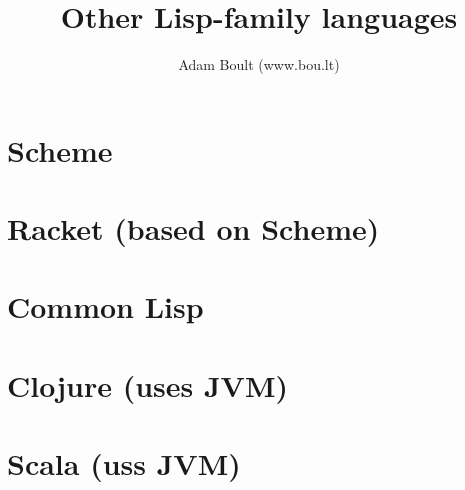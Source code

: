 \documentclass[oneside]{book}
\begin{document}
\author{Adam Boult (www.bou.lt)}
\title{Other Lisp-family languages}
\maketitle

\setcounter{tocdepth}{0}
\tableofcontents



\part{Scheme}

\part{Racket (based on Scheme)}

\part{Common Lisp}

\part{Clojure (uses JVM)}

\part{Scala (uss JVM)}
\end{document}
